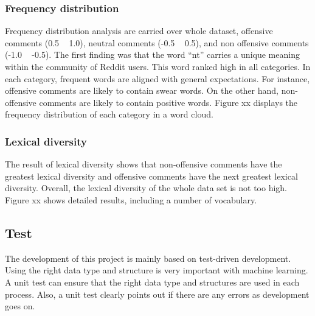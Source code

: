 \documentclass[11pt, natbib=false]{article}
\begin{document}
\subsubsection{Frequency distribution}
Frequency distribution analysis are carried over whole dataset, offensive comments (0.5 ~ 1.0), neutral comments (-0.5 ~ 0.5), and non offensive comments (-1.0 ~ -0.5).
The first finding was that the word “nt” carries a unique meaning within the community of Reddit users.
This word ranked high in all categories.
In each category, frequent words are aligned with general expectations.
For instance, offensive comments are likely to contain swear words.
On the other hand, non-offensive comments are likely to contain positive words.
Figure xx displays the frequency distribution of each category in a word cloud.

\subsubsection{Lexical diversity}
The result of lexical diversity shows that non-offensive comments have the greatest lexical diversity and offensive comments have the next greatest lexical diversity.
Overall, the lexical diversity of the whole data set is not too high.
Figure xx shows detailed results, including a number of vocabulary.

\subsection{Test}
The development of this project is mainly based on test-driven development.
Using the right data type and structure is very important with machine learning.
A unit test can ensure that the right data type and structures are used in each process.
Also, a unit test clearly points out if there are any errors as development goes on.
\end{document}
